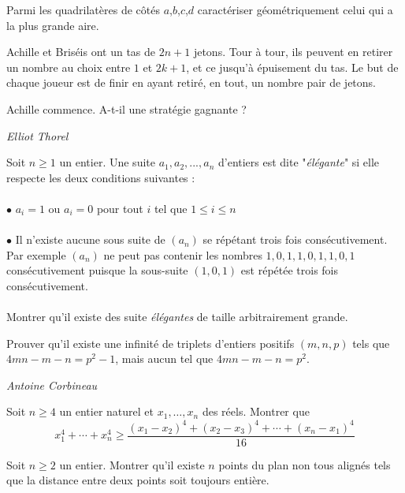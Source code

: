 \begin{exo}{}
Parmi les quadrilatères de côtés
$a$,$b$,$c$,$d$ caractériser géométriquement celui qui a la plus
grande aire.
\end{exo}

\begin{exo}{ }
Achille et Briséis ont un tas de $2n+1$ jetons. Tour à tour, ils peuvent en retirer un nombre au choix entre $1$ et $2k+1$, et ce jusqu'à épuisement du tas. Le but de chaque joueur est de finir en ayant retiré, en tout,
un nombre pair de jetons.

Achille commence. A-t-il une stratégie gagnante ?

\medskip
\textit{Elliot Thorel}
\end{exo}

\begin{exo}{}
Soit $n\ge 1$ un entier. Une suite $a_1,a_2,...,a_n$ d'entiers est dite "\textit{élégante}" si elle respecte les deux conditions suivantes :\\~~\\
$\bullet$ $a_i=1$ ou $a_i=0$ pour tout $i$ tel que $1\le i\le n$\\~~\\
$\bullet$ Il n'existe aucune sous suite de $(a_n)$ se répétant trois fois consécutivement. Par exemple $(a_n)$ ne peut pas contenir les nombres $1,0,1,1,0,1,1,0,1$  consécutivement puisque la sous-suite $(1,0,1)$ est répétée trois fois consécutivement. \\~~\\
Montrer qu'il existe des suite \textit{élégantes} de taille arbitrairement grande.

\end{exo}

\begin{exo}{}
Prouver qu'il existe une infinité de triplets d'entiers positifs $(m,n,p)$ tels que $4mn-m-n=p^2-1$, mais aucun tel que $4mn-m-n=p^2$.

\medskip
\textit{Antoine Corbineau}
\end{exo}

\begin{exo}{}
Soit $n \geq 4$ un entier naturel et $x_1, \dots, x_n$ des réels. Montrer que
$$x_1^4+\cdots+x_n^4 \geq \dfrac{(x_1-x_2)^4+(x_2-x_3)^4+ \cdots +(x_n-x_1)^4}{16}$$\end{exo}


\begin{exo}{}
Soit $n\ge 2$ un entier. Montrer qu'il existe $n$ points du plan non tous alignés tels que la distance entre deux points soit toujours entière.
\end{exo}

